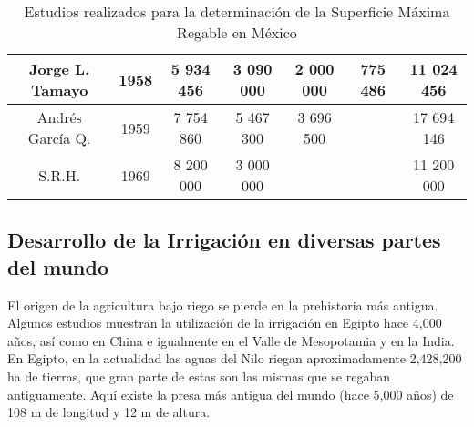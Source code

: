 \begin{table}[h!]
\begin{turn}{90}
\begin{tabular}{|c|c|c|c|c|c|c|}
			Jorge L. Tamayo                                                                   & 1958                                                                         & 5 934 456                                                                       & 3 090 000                                                                                    & 2 000 000                                                                                    & 775 486                                                                  & 11 024 456            \\ \hline
			Andrés García Q.                                                                  & 1959                                                                         & 7 754 860                                                                       & 5 467 300                                                                                    & 3 696 500                                                                                    &                                                                          & 17 694 146            \\ \hline
			S.R.H.                                                                            & 1969                                                                         & 8 200 000                                                                       & 3 000 000                                                                                    &                                                                                              &                                                                          & 11 200 000            \\ \hline
		\end{tabular}
	\end{turn}
	\caption{Estudios realizados para la determinación de la Superficie Máxima
		Regable en México }
	\label{tabnine}
\end{table}
\subsection{Desarrollo de la Irrigación en diversas partes del mundo}

El origen de la agricultura bajo riego se pierde en la prehistoria más antigua. Algunos estudios muestran la utilización de la irrigación en Egipto hace 4,000 años, así como en China e igualmente en el Valle de Mesopotamia y en la India. En Egipto, en la actualidad las aguas del Nilo riegan aproximadamente 2,428,200 ha de tierras, que gran parte de estas son las mismas que se regaban antiguamente. Aquí existe la presa más antigua del mundo (hace 5,000 años) de 108 m de longitud y 12 m de altura.

